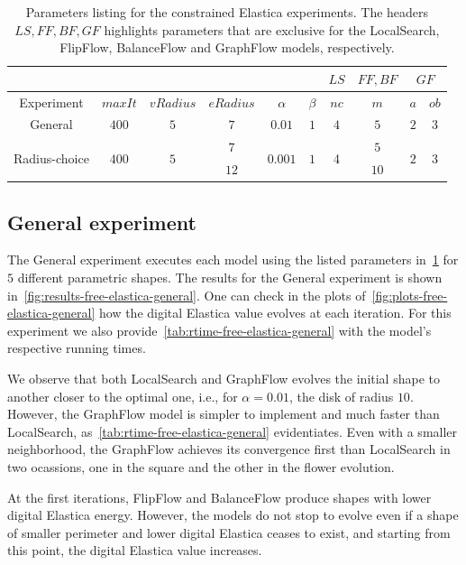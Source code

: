 \begin{table}
\centering
\begin{tabular}{|c|c|c|c|c|c|c|c|c|c|}
\cline{7-10}
\multicolumn{6}{c|}{} & $LS$ & $FF,BF$ & \multicolumn{2}{|c|}{$GF$}\\
\hline
Experiment & $maxIt$ & $vRadius$ & $eRadius$ & $\alpha$ & $\beta$  & $nc$ & $m$ & $a$ & $ob$ \\
\hline
General & $400$ & $5$ & $7$ & $0.01$ & $1$  & $4$ & $5$ & $2$ & $3$ \\
\hline
\multirow{2}{*}{Radius-choice} & \multirow{2}{*}{$400$} & \multirow{2}{*}{$5$} & $7$ & \multirow{2}{*}{$0.001$} & \multirow{2}{*}{$1$}  & \multirow{2}{*}{4} & $5$ & \multirow{2}{*}{$2$} & \multirow{2}{*}{$3$} \\
& &  & $12$ &  & & & $10$ & &  \\
\hline
\end{tabular}
\caption{Parameters listing for the constrained Elastica experiments. The headers $LS,FF,BF,GF$ highlights parameters that are exclusive for the LocalSearch, FlipFlow, BalanceFlow and GraphFlow models, respectively.}
\label{tab:free-elastica-parameters-summary}
\end{table}

\subsection{General experiment}

  The General experiment executes each model using the listed parameters in~\cref{tab:free-elastica-parameters-summary} for $5$ different parametric shapes. The results for the General experiment is shown in~\cref{fig:results-free-elastica-general}. One can check in the plots of~\cref{fig:plots-free-elastica-general} how the digital Elastica value evolves at each iteration. For this experiment we also provide~\cref{tab:rtime-free-elastica-general} with the model's respective running times.
  

We observe that both LocalSearch and GraphFlow evolves the initial shape to another closer to the optimal one, i.e., for $\alpha=0.01$, the disk of radius $10$. However, the GraphFlow model is simpler to implement and much faster than LocalSearch, as~\cref{tab:rtime-free-elastica-general} evidentiates. Even with a smaller neighborhood, the GraphFlow achieves its convergence first than LocalSearch in two ocassions, one in the square and the other in the flower evolution.

At the first iterations, FlipFlow and BalanceFlow produce shapes with lower digital Elastica energy. However, the models do not stop to evolve even if a shape of smaller perimeter and lower digital Elastica ceases to exist, and starting from this point, the digital Elastica value increases.


